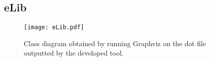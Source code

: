 \begin{appendices}
\section{eLib}\label{app:eLib}
\begin{figure}
\center
\texttt{[image: eLib.pdf]}
\caption{Class diagram obtained by running Graphviz on the dot file outputted by the developed tool.}
\label{fig:eLib}
\end{figure}
\end{appendices}
